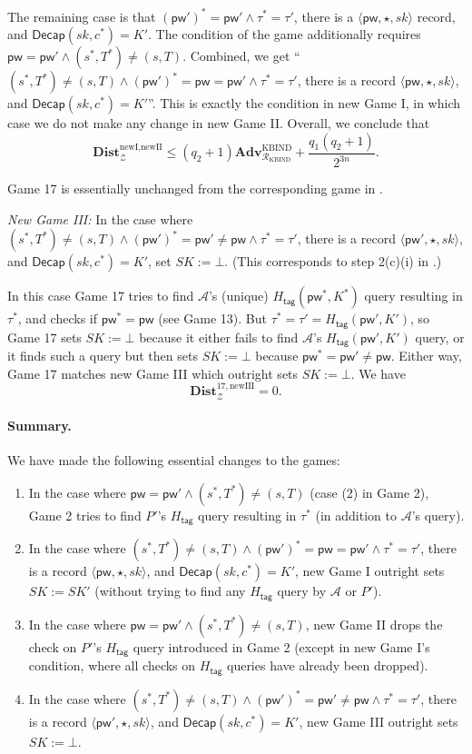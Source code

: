 \documentclass{article}
\theoremstyle{plain}
\theoremstyle{definition}
\theoremstyle{remark}
\newcommand{\adv}{\mathcal{A}}
\newcommand{\env}{\mathcal{Z}}
\newcommand{\red}{\mathcal{R}}
\newcommand{\Adv}{\mathbf{Adv}}
\newcommand{\Dist}{\mathbf{Dist}}
\newcommand{\Decap}{\mathsf{Decap}}
\newcommand{\Htag}{H_\mathsf{tag}}
\newcommand{\pw}{\mathsf{pw}}
\begin{document}
The remaining case is that $(\pw')^* = \pw' \land \tau^* = \tau'$, there is a $\langle\pw,\star,sk\rangle$ record, and $\Decap(sk,c^*) = K'$. The condition of the game additionally requires $\pw = \pw' \land (s^*,T^*) \neq (s,T)$. Combined, we get ``$(s^*,T^*) \neq (s,T) \land (\pw')^* = \pw = \pw' \land \tau^* = \tau'$, there is a record $\langle\pw,\star,sk\rangle$, and $\Decap(sk,c^*) = K'$''. This is exactly the condition in new Game I, in which case we do not make any change in new Game II. Overall, we conclude that
\[
\Dist_\env^{\text{newI},\text{newII}} \leq (q_2+1)\Adv_{\red_\text{KBIND}}^\text{KBIND} + \frac{q_1(q_2+1)}{2^{3n}}.
\]

Game 17 is essentially unchanged from the corresponding game in .

\medskip\noindent\emph{New Game III:}
In the case where $(s^*,T^*) \neq (s,T) \land (\pw')^* = \pw' \neq \pw \land \tau^* = \tau'$, there is a record $\langle\pw',\star,sk\rangle$, and $\Decap(sk,c^*) = K'$, set $SK := \bot$. (This corresponds to step 2(c)(i) in .)

In this case Game 17 tries to find $\adv$'s (unique) $\Htag(\pw^*,K^*)$ query resulting in $\tau^*$, and checks if $\pw^* = \pw$ (see Game 13). But $\tau^* = \tau' = \Htag(\pw',K')$, so Game 17 sets $SK := \bot$ because it either fails to find $\adv$'s $\Htag(\pw',K')$ query, or it finds such a query but then sets $SK := \bot$ because $\pw^* = \pw' \neq \pw$. Either way, Game 17 matches new Game III which outright sets $SK := \bot$. We have
\[
\Dist_\env^{17,\text{newIII}} = 0.
\]

\paragraph{Summary.}
We have made the following essential changes to the games:
\begin{enumerate}
  \item In the case where $\pw = \pw' \land (s^*,T^*) \neq (s,T)$ (case (2) in Game 2), Game 2 tries to find $P'$'s $\Htag$ query resulting in $\tau^*$ (in addition to $\adv$'s query).
  \item In the case where $(s^*,T^*) \neq (s,T) \land (\pw')^* = \pw = \pw' \land \tau^* = \tau'$, there is a record $\langle\pw,\star,sk\rangle$, and $\Decap(sk,c^*) = K'$, new Game I outright sets $SK := SK'$ (without trying to find any $\Htag$ query by $\adv$ or $P'$).
  \item In the case where $\pw = \pw' \land (s^*,T^*) \neq (s,T)$, new Game II drops the check on $P'$'s $\Htag$ query introduced in Game 2 (except in new Game I's condition, where all checks on $\Htag$ queries have already been dropped).
  \item In the case where $(s^*,T^*) \neq (s,T) \land (\pw')^* = \pw' \neq \pw \land \tau^* = \tau'$, there is a record $\langle\pw',\star,sk\rangle$, and $\Decap(sk,c^*) = K'$, new Game III outright sets $SK := \bot$.
\end{enumerate}
\end{document}
